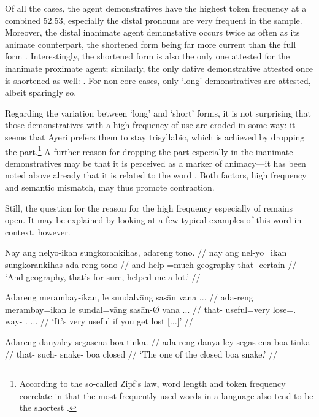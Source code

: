 Of all the cases, the agent demonstratives have the highest token frequency at
a combined 52.53\pct{}, especially the distal pronouns are very frequent in the
sample. Moreover, the distal inanimate agent demonstative occurs twice as often
as its animate counterpart, the shortened form  being far more current than the full form .
Interestingly, the shortened form  is also the
only one attested for the inanimate proximate agent; similarly, the only dative
demonstrative attested once is shortened as well: . For non-core cases, only `long' demonstratives are attested, albeit
sparingly so.

Regarding the variation between `long' and `short' forms, it is not surprising
that those demonstratives with a high frequency of use are eroded in some way:
it seems that Ayeri prefers them to stay trisyllabic, which is achieved by
dropping the  part.\footnote{According to the so-called Zipf's
law, word length and token frequency correlate in that the most frequently used
words in a language also tend to be the shortest \citep[25--27]{zipf1935}.} A
further reason for dropping the  part especially in the inanimate
demonstratives may be that it is perceived as a marker of animacy---it has been
noted above already that it is related to the word .
Both factors, high frequency and semantic mismatch, may thus promote
contraction.

Still, the question for the reason for the high frequency especially of 
 remains open. It may be explained by looking at a few 
typical examples of this word in context, however.

\pex[glspace=0.5em]\label{ex:demexpl}
\a\begingl
	\gla Nay ang nelyo-ikan sungkorankihas, adareng tono. //
	\glb nay ang nel-yo=ikan sungkorankihas ada-reng tono //
	\glc and \AgtT{} help-\TsgN{}=much geography that-\AargI{} certain //
	\glft `And geography, that's for sure, helped me a lot.'%
		 //
\endgl

\a\begingl
	\gla Adareng merambay-ikan, le sundalvāng sasān {vana ...} //
	\glb ada-reng merambay=ikan le sundal=vāng sasān-Ø {vana ...} //
	\glc that-\AargI{} useful=very \PatTI{} lose=\Ssg{}.\Aarg{} way-\Top{} 
		{\Ssg{}.\Gen{} ...} //
	\glft `It’s very useful if you get lost [...]'%
		 //
\endgl

\a\begingl
	\gla Adareng danyaley segasena boa tinka. //
	\glb ada-reng danya-ley segas-ena boa tinka //
	\glc that-\AargI{} such-\PargI{} snake-\Gen{} boa closed //
	\glft `The one of the closed boa snake.'\footnotemark%
		 //
\endgl

